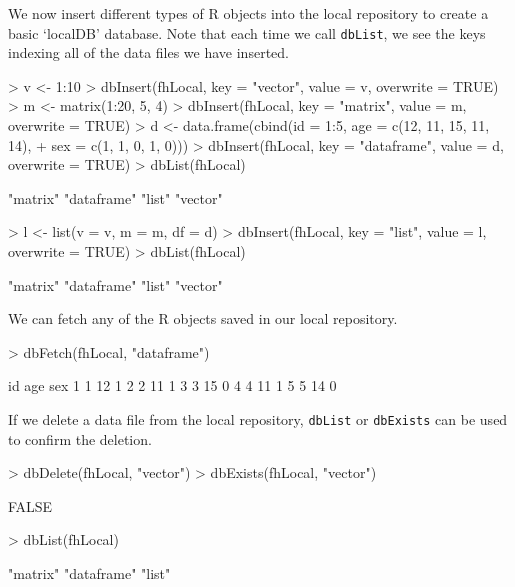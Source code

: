 \documentclass{article}
\newcommand{\code}{\texttt}
\begin{document}
\noindent We now insert different types of R objects into the local repository to 
create a basic `localDB' database. Note that each time we call 
\code{dbList}, we see the keys indexing all of the data files we have inserted.

\begin{Schunk}
\begin{Sinput}
> v <- 1:10
> dbInsert(fhLocal, key = "vector", value = v, overwrite = TRUE)
> m <- matrix(1:20, 5, 4)
> dbInsert(fhLocal, key = "matrix", value = m, overwrite = TRUE)
> d <- data.frame(cbind(id = 1:5, age = c(12, 11, 15, 11, 14), 
+     sex = c(1, 1, 0, 1, 0)))
> dbInsert(fhLocal, key = "dataframe", value = d, overwrite = TRUE)
> dbList(fhLocal)
\end{Sinput}
\begin{Soutput}
[1] "matrix"    "dataframe" "list"      "vector"   
\end{Soutput}
\begin{Sinput}
> l <- list(v = v, m = m, df = d)
> dbInsert(fhLocal, key = "list", value = l, overwrite = TRUE)
> dbList(fhLocal)
\end{Sinput}
\begin{Soutput}
[1] "matrix"    "dataframe" "list"      "vector"   
\end{Soutput}
\end{Schunk}

\noindent We can fetch any of the R objects saved in our local repository.
\begin{Schunk}
\begin{Sinput}
> dbFetch(fhLocal, "dataframe")
\end{Sinput}
\begin{Soutput}
  id age sex
1  1  12   1
2  2  11   1
3  3  15   0
4  4  11   1
5  5  14   0
\end{Soutput}
\end{Schunk}

\noindent If we delete a data file from the local repository, \code{dbList} or
\code{dbExists} can be used to confirm the deletion.
\begin{Schunk}
\begin{Sinput}
> dbDelete(fhLocal, "vector")
> dbExists(fhLocal, "vector")
\end{Sinput}
\begin{Soutput}
[1] FALSE
\end{Soutput}
\begin{Sinput}
> dbList(fhLocal)
\end{Sinput}
\begin{Soutput}
[1] "matrix"    "dataframe" "list"     
\end{Soutput}
\end{Schunk}
\end{document}
